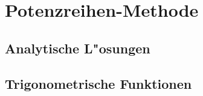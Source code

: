 %
%
%
\chapter{Potenzreihen-Methode\label{chapter:potenzreihen}}
\lhead{}
\section{Analytische L"osungen}
\section{Trigonometrische Funktionen}
